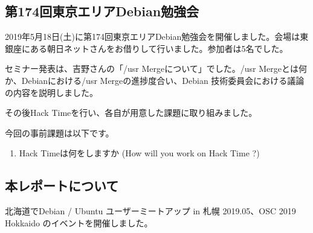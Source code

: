 \documentclass[mingoth,a4paper]{jsarticle}
\begin{document}

\subsection{第174回東京エリアDebian勉強会}

2019年5月18日(土)に第174回東京エリアDebian勉強会を開催しました。会場は東銀座にある朝日ネットさんをお借りして行いました。参加者は5名でした。

セミナー発表は、吉野さんの「/usr Mergeについて」でした。/usr Mergeとは何か、Debianにおける/usr Mergeの進捗度合い、Debian 技術委員会における議論の内容を説明しました。

その後Hack Timeを行い、各自が用意した課題に取り組みました。



今回の事前課題は以下です。

\begin{enumerate}
\item Hack Timeは何をしますか (How will you work on Hack Time ?)
\end{enumerate}


\begin{multicols}{2}
{\small

}
\end{multicols}

%
%
%
%





\subsection{本レポートについて}

北海道でDebian / Ubuntu ユーザーミートアップ in 札幌 2019.05、OSC 2019 Hokkaido のイベントを開催しました。
\end{document}
